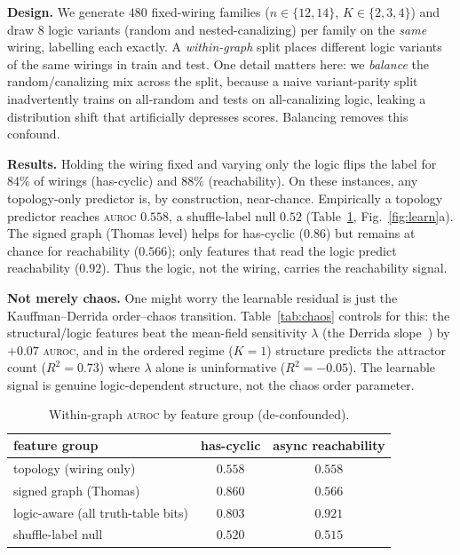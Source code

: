 \documentclass[journal]{IEEEtran}
\newcommand{\auroc}{\textsc{auroc}}
\begin{document}
\textbf{Design.} We generate $480$ fixed-wiring families ($n\in\{12,14\}$,
$K\in\{2,3,4\}$) and draw $8$ logic variants (random and nested-canalizing) per family
on the \emph{same} wiring, labelling each exactly. A \emph{within-graph} split places
different logic variants of the same wirings in train and test. One detail matters here:
we \emph{balance} the random/canalizing mix across the split, because a naive variant-parity split
inadvertently trains on all-random and tests on all-canalizing logic, leaking a
distribution shift that artificially depresses scores. Balancing removes this confound.

\textbf{Results.} Holding the wiring fixed and varying only the logic flips the label
for $84\%$ of wirings (has-cyclic) and $88\%$ (reachability). On these instances,
any topology-only predictor is, by construction, near-chance. Empirically a topology
predictor reaches \auroc{} $0.558$, a shuffle-label null $0.52$
(Table~\ref{tab:identify}, Fig.~\ref{fig:learn}a). The signed graph (Thomas level) helps for
has-cyclic ($0.86$) but remains at chance for reachability ($0.566$); only features
that read the logic predict reachability ($0.92$). Thus the logic, not the wiring,
carries the reachability signal.

\textbf{Not merely chaos.} One might worry the learnable residual is just the
Kauffman--Derrida order--chaos transition. Table~\ref{tab:chaos} controls for this: the
structural/logic features beat the mean-field sensitivity $\lambda$ (the Derrida
slope~\cite{derrida1986})
by ${+}0.07$ \auroc{}, and in the ordered regime ($K=1$) structure predicts the
attractor count ($R^2=0.73$) where $\lambda$ alone is uninformative ($R^2=-0.05$). The
learnable signal is genuine logic-dependent structure, not the chaos order parameter.

\begin{table}[t]
\caption{Within-graph \auroc{} by feature group (de-confounded).}
\label{tab:identify}
\centering
\begin{tabular}{lcc}
\toprule
feature group & has-cyclic & async reachability\\
\midrule
topology (wiring only) & $0.558$ & $0.558$\\
signed graph (Thomas) & $0.860$ & $0.566$\\
logic-aware (all truth-table bits) & $0.803$ & $0.921$\\
shuffle-label null & $0.520$ & $0.515$\\
\bottomrule
\end{tabular}
\end{table}
\end{document}
